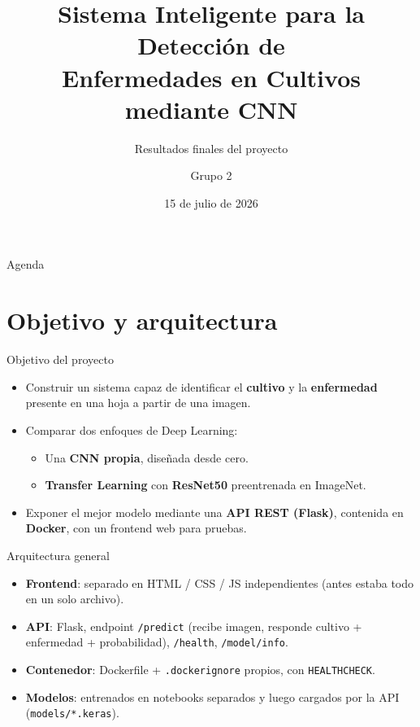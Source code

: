 \documentclass[aspectratio=169]{beamer}
\title[Detección de Enfermedades en Cultivos]{Sistema Inteligente para la Detección de\\Enfermedades en Cultivos mediante CNN}
\subtitle{Resultados finales del proyecto}
\author{Grupo 2}
\date{15 de julio de 2026}
\begin{document}
\begin{frame}
  \titlepage
\end{frame}

\begin{frame}{Agenda}
  \tableofcontents
\end{frame}

\section{Objetivo y arquitectura}

\begin{frame}{Objetivo del proyecto}
  \begin{itemize}
    \item Construir un sistema capaz de identificar el \textbf{cultivo} y la \textbf{enfermedad} presente en una hoja a partir de una imagen.
    \item Comparar dos enfoques de Deep Learning:
    \begin{itemize}
      \item Una \textbf{CNN propia}, diseñada desde cero.
      \item \textbf{Transfer Learning} con \textbf{ResNet50} preentrenada en ImageNet.
    \end{itemize}
    \item Exponer el mejor modelo mediante una \textbf{API REST (Flask)}, contenida en \textbf{Docker}, con un frontend web para pruebas.
  \end{itemize}
\end{frame}

\begin{frame}{Arquitectura general}
  \begin{itemize}
    \item \textbf{Frontend}: separado en HTML / CSS / JS independientes (antes estaba todo en un solo archivo).
    \item \textbf{API}: Flask, endpoint \texttt{/predict} (recibe imagen, responde cultivo + enfermedad + probabilidad), \texttt{/health}, \texttt{/model/info}.
    \item \textbf{Contenedor}: Dockerfile + \texttt{.dockerignore} propios, con \texttt{HEALTHCHECK}.
    \item \textbf{Modelos}: entrenados en notebooks separados y luego cargados por la API (\texttt{models/*.keras}).
  \end{itemize}
\end{frame}
\end{document}
